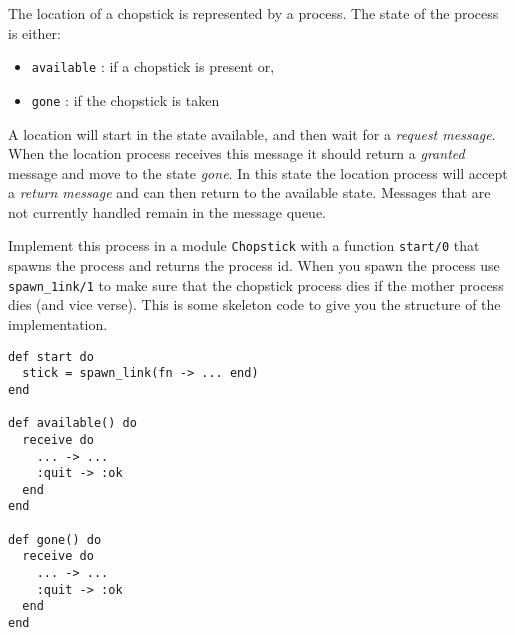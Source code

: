 \documentclass[a4paper,11pt]{article}
\begin{document}
The location of a chopstick is represented by a process. The state of
the process is either:

\begin{itemize}
\item {\tt available} : if a chopstick is present or,
\item {\tt gone} : if the chopstick is taken
\end{itemize}

A location will start in the state available, and then wait for a {\em request message}. When the location process receives this message it
should return a {\em granted} message and move to the state {\em gone}.
In this state the location process will accept a {\em return message} 
and can then return to the available state. Messages that are not currently handled remain in the message queue.

\begin{figure}[h!]
    \centering
\end{figure}

Implement this process in a module {\tt Chopstick} with a
function {\tt start/0} that spawns the process and returns the process
id. When you spawn the process use {\tt spawn\_1ink/1} to make sure
that the chopstick process dies if the mother process dies (and vice
verse). This is some skeleton code to give you the structure of the
implementation.

\begin{verbatim}
def start do
  stick = spawn_link(fn -> ... end)
end

def available() do
  receive do
    ... -> ...
    :quit -> :ok
  end
end

def gone() do
  receive do
    ... -> ...
    :quit -> :ok
  end
end
\end{verbatim}
\end{document}
